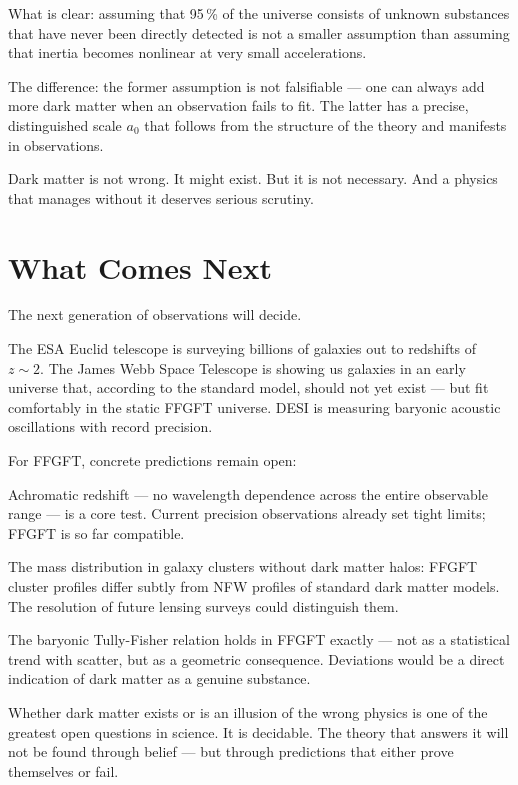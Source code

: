 \documentclass[11pt,oneside]{book}
\begin{document}
\medskip

What is clear: assuming that 95\,\% of the universe
consists of unknown substances that have never been directly
detected is not a smaller assumption than assuming that
inertia becomes nonlinear at very small accelerations.

The difference: the former assumption is not falsifiable —
one can always add more dark matter when an observation
fails to fit. The latter has a precise, distinguished scale
$a_0$ that follows from the structure of the theory and
manifests in observations.

Dark matter is not wrong. It might exist. But it is not
necessary. And a physics that manages without it deserves
serious scrutiny.

\chapter{What Comes Next}

The next generation of observations will decide.

The ESA Euclid telescope is surveying billions of galaxies
out to redshifts of $z \sim 2$. The James Webb Space
Telescope is showing us galaxies in an early universe that,
according to the standard model, should not yet exist —
but fit comfortably in the static FFGFT universe. DESI is
measuring baryonic acoustic oscillations with record
precision.

For FFGFT, concrete predictions remain open:

Achromatic redshift — no wavelength dependence across the
entire observable range — is a core test. Current
precision observations already set tight limits; FFGFT is
so far compatible.

The mass distribution in galaxy clusters without dark
matter halos: FFGFT cluster profiles differ subtly from
NFW profiles of standard dark matter models. The resolution
of future lensing surveys could distinguish them.

The baryonic Tully-Fisher relation holds in FFGFT exactly
— not as a statistical trend with scatter, but as a
geometric consequence. Deviations would be a direct
indication of dark matter as a genuine substance.

\medskip

Whether dark matter exists or is an illusion of the wrong
physics is one of the greatest open questions in science.
It is decidable. The theory that answers it will not be
found through belief — but through predictions that either
prove themselves or fail.
\end{document}
